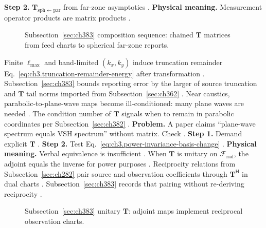 \textbf{Step 2.} \(\mathbf{T}_{\mathrm{sph}\leftarrow\mathrm{par}}\) from far-zone asymptotics \cite{stratton1941}.
\textbf{Physical meaning.} Measurement operator products are matrix products \cite{harrington2001}.
\begin{figure}[t]
\centering
{}
\caption{Subsection~\ref{sec:ch383} composition sequence: chained \(\mathbf{T}\) matrices from feed charts to spherical far-zone reports.}
\label{fig:ch3.383-composition-pipeline}
\end{figure}
Finite \(\ell_{\max}\) and band-limited \((k_{x},k_{y})\) induce truncation remainder Eq.~\eqref{eq:ch3.truncation-remainder-energy}
after transformation \cite{harrington2001}. Subsection~\ref{sec:ch383} bounds reporting error by the larger of source truncation and
\(\mathbf{T}\) tail norms imported from Subsection~\ref{sec:ch362} \cite{stratton1941}.
Near caustics, parabolic-to-plane-wave maps become ill-conditioned: many plane waves are needed \cite{jackson1999}. The
condition number of \(\mathbf{T}\) signals when to remain in parabolic coordinates per Subsection~\ref{sec:ch382} \cite{stratton1941}.
\textbf{Problem.} A paper claims ``plane-wave spectrum equals VSH spectrum'' without matrix. Check
\cite{harrington2001}.
\textbf{Step 1.} Demand explicit \(\mathbf{T}\) \cite{hansen1988}.
\textbf{Step 2.} Test Eq.~\eqref{eq:ch3.power-invariance-basis-change} \cite{poynting1884}.
\textbf{Physical meaning.} Verbal equivalence is insufficient \cite{stratton1941}.
When \(\mathbf{T}\) is unitary on \(\mathcal{F}_{\mathrm{rad}}\), the adjoint equals the inverse for power purposes
\cite{stratton1941}. Reciprocity relations from Subsection~\ref{sec:ch282} pair source and observation coefficients through
\(\mathbf{T}^{\mathsf{H}}\) in dual charts \cite{stratton1941}. Subsection~\ref{sec:ch383} records that pairing without re-deriving
reciprocity \cite{harrington2001}.
\begin{figure}[t]
\centering
{}
\caption{Subsection~\ref{sec:ch383} unitary \(\mathbf{T}\): adjoint maps implement reciprocal observation charts.}
\label{fig:ch3.383-unitary-adjoint}
\end{figure}
